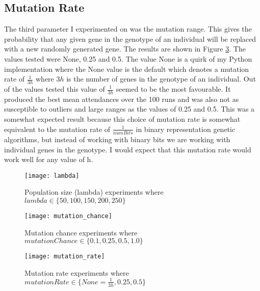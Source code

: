 \documentclass[11pt]{article}
\begin{document}
\subsection{Mutation Rate}

The third parameter I experimented on was the mutation range.
This gives the probability that any given gene in the genotype of an individual will be replaced with a new randomly generated gene.
The results are shown in Figure \ref{fig:mutation_rate}.
The values tested were None, 0.25 and 0.5.
The value None is a quirk of my Python implementation where the None value is the default which denotes a mutation rate of $\frac{1}{3h}$ where $3h$ is the number of genes in the genotype of an individual.
Out of the values tested this value of $\frac{1}{3h}$ seemed to be the most favourable.
It produced the best mean attendances over the 100 runs and was also not as susceptible to outliers and large ranges as the values of 0.25 and 0.5.
This was a somewhat expected result because this choice of mutation rate is somewhat equivalent to the mutation rate of $\frac{1}{numBits}$ in binary representation genetic algorithms, but instead of working with binary bits we are working with individual genes in the genotype.
I would expect that this mutation rate would work well for any value of h.

\begin{figure}[H]
  \texttt{[image: lambda]}
  \centering
  \caption{Population size (lambda) experiments where $lambda \in \{50, 100, 150, 200, 250\}$}
  \label{fig:lambda}
\end{figure}

\begin{figure}[h]
  \texttt{[image: mutation\_chance]}
  \centering
  \caption{Mutation chance experiments where $mutationChance \in \{0.1, 0.25, 0.5, 1.0\}$}
  \label{fig:mutation_chance}
\end{figure}

\begin{figure}[h]
  \texttt{[image: mutation\_rate]}
  \centering
  \caption{Mutation rate experiments where $mutationRate \in \{None=\frac{1}{3h}, 0.25, 0.5\}$}
  \label{fig:mutation_rate}
\end{figure}
\end{document}
